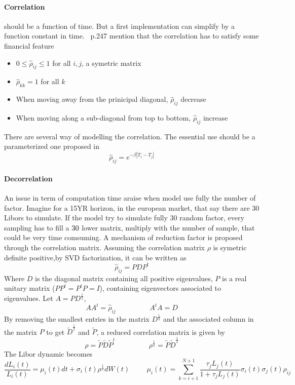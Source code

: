 \documentclass[a4paper,10pt]{article}
\newcommand{\Lit}{L_{i}(t)}
\newcommand{\muit}{\mu_i(t)}
\newcommand{\sigmait}{\sigma_i(t)}
\newcommand{\Ljt}{L_{j}(t)}
\newcommand{\sigmajt}{\sigma_j(t)}
\newcommand{\rhoij}{\rho_{ij}}
\begin{document}
\paragraph{Correlation} should be a function of time. But a first implementation can simplify by a function constant in time. ~\cite{BRIGO2006}p.247 mention that the correlation has to satisfy some financial feature
\begin{itemize}
\item $0 \leq \hat{\rho}_{ij} \leq 1 $ for all $i,j$, a symetric matrix
\item $\hat{\rho}_{kk} = 1 $ for all $k$ 
\item When moving away from the prinicipal diagonal, $\hat{\rho}_{ij}$ decrease 
\item When moving along a sub-diagonal from top to bottom, $\hat{\rho}_{ij}$ increase 
\end{itemize} 
There are several way of modelling the correlation. The essential use should be a parameterized one proposed in \cite{REBONATO2009}
\[
\hat{\rho}_{ij} = e^{- \beta |T_i-T_j|}
\]
\paragraph{Decorrelation}
An issue in term of computation time araise when model use fully the number of factor. Imagine for a 15YR horizon, in the european market, that say there are 30 Libors to simulate. If the model try to simulate fully 30 random factor, every sampling has to fill a $30\time30$ lower matrix, multiply with the number of sample, that could be very time comsuming. A mechanism of reduction factor is proposed through the correlation matrix. Assuming the correlation matrix $\rho$ is symetric definite positive,by SVD factorization, it can be written as
\[
\hat{\rho}_{ij} = PDP^t
\]
Where $D$ is the diagonal matrix containing all positive eigenvalues, $P$ is a real unitary matrix ($PP^t =P^tP = I $), containing eigenvectors associated to eigenvalues. Let $A=PD^{\frac{1}{2}}$, 
\[
AA^t = \hat{\rho}_{ij}
\hspace{2cm}
A^tA = D
\]
By removing the smallest entries in the matrix $D^{\frac{1}{2}}$ and the associated column in the matrix $P$ to get $\tilde{D}^{\frac{1}{2}}$ and $\tilde{P}$,  a reduced correlation matrix is given by
\[
\rho = \tilde{P}\tilde{D}\tilde{P}^t
\hspace{2cm}
\rho^{\frac{1}{2}} =  \tilde{P}\tilde{D}^{\frac{1}{2}}
\]
The Libor dynamic becomes
\begin{equation}
\label{eq:reduced_libor_dynamic}
\frac{d\Lit}{\Lit} = \muit dt + \sigmait \rho^{\frac{1}{2} } dW(t)
\hspace{1cm}
\muit = \sum_{k=i+1}^{N+1} \frac{\tau_j \Ljt}{1+\tau_j \Ljt} \sigmait \sigmajt \rhoij
\end{equation}
\end{document}
